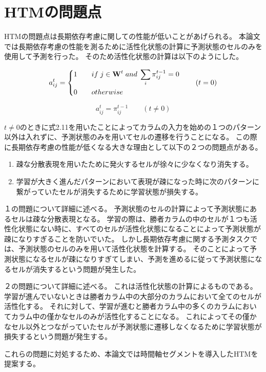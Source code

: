 \section{HTMの問題点}
HTMの問題点は長期依存考慮に関しての性能が低いことがあげられる。
本論文では長期依存考慮の性能を測るために活性化状態の計算に予測状態のセルのみを使用して予測を行った。
そのため活性化状態の計算は以下のようにした。

\begin{equation}
  a^t_{ij} =
  \left\{
  \begin{alignedat}{2}
      1 \qquad &if \; j\in{\bf W}^t \; and \; \sum_i \pi^{t-1}_{ij} = 0\\
      0 \qquad &otherwise\\
  \end{alignedat}
  \right. \qquad (t = 0)\\
\end{equation}

\begin{equation}
  a^t_{ij} = \pi^{t-1}_{ij} \qquad (t \neq 0)
\end{equation}

$t \neq 0$のときに式2.11を用いたことによってカラムの入力を始めの１つのパターン以外は入れずに、予測状態のみを用いてセルの遷移を行うことになる。
この際に長期依存考慮の性能が低くなる大きな理由として以下の２つの問題点がある。

\begin{enumerate}
  \item 疎な分散表現を用いたために発火するセルが徐々に少なくなり消失する。
  \item 学習が大きく進んだパターンにおいて表現が疎になった時に次のパターンに繋がっていたセルが消失するために学習状態が損失する。
\end{enumerate}

１の問題について詳細に述べる。
予測状態のセルの計算によって予測状態にあるセルは疎な分散表現となる。
学習の際は、勝者カラムの中のセルが１つも活性化状態にない時に、すべてのセルが活性化状態になることによって予測状態が疎になりすぎることを防いでいた。
しかし長期依存考慮に関する予測タスクでは、予測状態のセルのみを用いて活性化状態を計算する。
そのことによって予測状態になるセルが疎になりすぎてしまい、予測を進めるに従って予測状態になるセルが消失するという問題が発生した。

２の問題について詳細に述べる。
これは活性化状態の計算によるものである。
学習が進んでいないときは勝者カラム中の大部分のカラムにおいて全てのセルが活性化する。
それに対して、学習が進むと勝者カラム中の多くのカラムにおいてカラム中の僅かなセルのみが活性化することになる。
これによってその僅かなセル以外とつながっていたセルが予測状態に遷移しなくなるために学習状態が損失するという問題が発生する。

これらの問題に対処するため、本論文では時間軸セグメントを導入したHTMを提案する。
